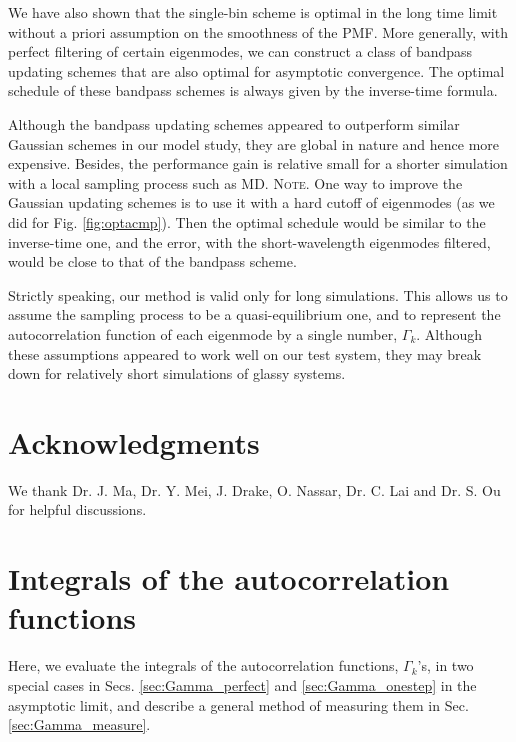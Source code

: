 \documentclass[reprint, floatfix]{revtex4-1}
\newcommand{\note}[1]{{\color{DarkGreen}\footnotesize \textsc{Note.} #1}}
\begin{document}
We have also shown that
the single-bin scheme is optimal
in the long time limit
without a priori assumption
on the smoothness of the PMF.
%
More generally, with perfect filtering
of certain eigenmodes, we can construct a
class of bandpass updating schemes
that are also optimal for asymptotic convergence.
%
The optimal schedule of these bandpass schemes
is always given by the inverse-time formula.

Although the bandpass updating schemes
appeared to outperform similar Gaussian schemes
in our model study,
they are global in nature
and hence more expensive.
%
Besides, the performance gain
is relative small for a shorter simulation
with a local sampling process such as MD.
%
\note{
One way to improve the Gaussian updating schemes
is to use it with a hard cutoff of eigenmodes
(as we did for Fig. \ref{fig:optacmp}).
%
Then the optimal schedule
would be similar to the inverse-time one,
and the error, with the short-wavelength eigenmodes filtered,
would be close to that of the bandpass scheme.
}



Strictly speaking, our method is valid
only for long simulations.
%
This allows us to assume the sampling process
to be a quasi-equilibrium one\cite{barducci2008, dama2014},
and to represent the autocorrelation function
of each eigenmode by a single number, $\Gamma_k$.
%
Although these assumptions appeared to work well
on our test system,
they may break down for relatively short simulations
of glassy systems.



\section{Acknowledgments}

We thank Dr. J. Ma, Dr. Y. Mei,
J. Drake, O. Nassar, Dr. C. Lai and Dr. S. Ou
for helpful discussions.


\appendix


\section{\label{sec:Gamma}
Integrals of the autocorrelation functions}



Here, we evaluate the integrals of
the autocorrelation functions,
$\Gamma_k$'s,
in two special cases
in Secs. \ref{sec:Gamma_perfect}
and \ref{sec:Gamma_onestep}
in the asymptotic limit,
and describe a general method of measuring them
in Sec. \ref{sec:Gamma_measure}.
\end{document}
